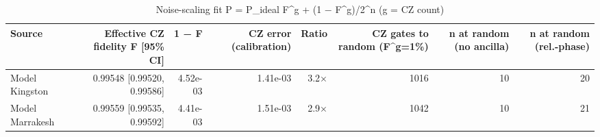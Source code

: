 \begin{table}[t]
\centering
\small
\caption{Noise-scaling fit P = P\_ideal F^g + (1 − F^g)/2^n (g = CZ count)}
\label{tab:fit}
\begin{tabular}{lrrrrrrr}
\toprule
Source & Effective CZ fidelity F [95\% CI] & 1 − F & CZ error (calibration) & Ratio & CZ gates to random (F^g=1\%) & n at random (no ancilla) & n at random (rel.-phase) \\
\midrule
Model Kingston & 0.99548 [0.99520, 0.99586] & 4.52e-03 & 1.41e-03 & 3.2× & 1016 & 10 & 20 \\
Model Marrakesh & 0.99559 [0.99535, 0.99592] & 4.41e-03 & 1.51e-03 & 2.9× & 1042 & 10 & 21 \\
\bottomrule
\end{tabular}
\end{table}
